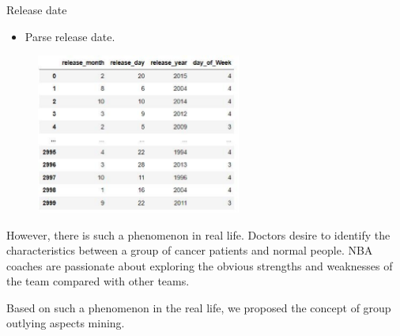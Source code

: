 \documentclass[
 size=12pt,
 paper=smartboard,  %
 mode=present, 		%
 display=slides, 	%
 style=tuliplab,  	%
 pauseslide,
 fleqn,leqno]{powerdot}
\begin{document}
\begin{slide}{Release date}
  \begin{itemize}
    \item
    Parse release date. 
  \end{itemize}
 \vspace{0.5cm}
  \begin{figure}[htbp]
    \centering
    \includegraphics[width=0.6\textwidth,height=0.45\textwidth]{figures/date1.eps}\\
  \end{figure}

\begin{note}
However,
there is such a phenomenon in real life.    
Doctors desire to identify the characteristics between
a group of cancer patients and normal people.
NBA coaches are passionate about exploring the obvious strengths and
weaknesses of the team compared with other teams.

Based on such a phenomenon in the real life,
we proposed the concept of group outlying aspects mining.
\end{note}

\end{slide}
\end{document}
